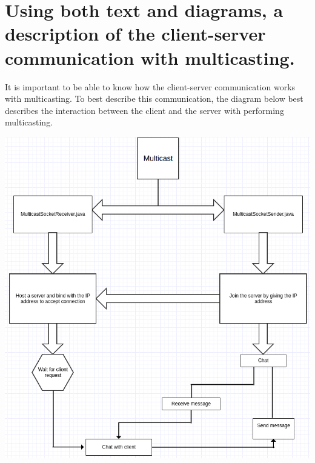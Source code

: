 \documentclass{article}
\begin{document}
\section{Using both text and diagrams, a description of the client-server communication with multicasting.}

It is important to be able to know how the client-server communication works with multicasting. To best describe this communication, the diagram below best describes the interaction between the client and the server with performing multicasting.

\includegraphics[scale=0.5]{csmulticast.png}
\end{document}
